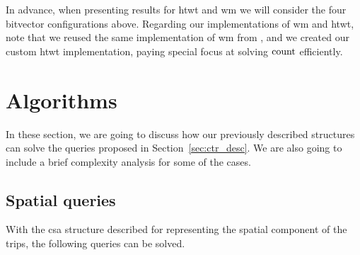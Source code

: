 	In advance, when presenting results for \gls{htwt} and \gls{wm} we will consider the four bitvector configurations
	above. Regarding our implementations of \gls{wm} and \gls{htwt}, note that we reused the same implementation of \gls{wm} from \cite{CNO15}, 
	and we created our custom \gls{htwt} implementation, paying special focus at solving $\operatorname{count}$ efficiently.

\section{Algorithms}
	In these section, we are going to discuss how our previously described structures can solve the queries proposed in Section~\ref{sec:ctr_desc}. We are also going to include a brief complexity analysis for some of the cases.

	\subsection{Spatial queries}
	\label{sec:sq}

	With the \gls{csa} structure described for representing the spatial component of the trips,
	the following queries can be solved.

